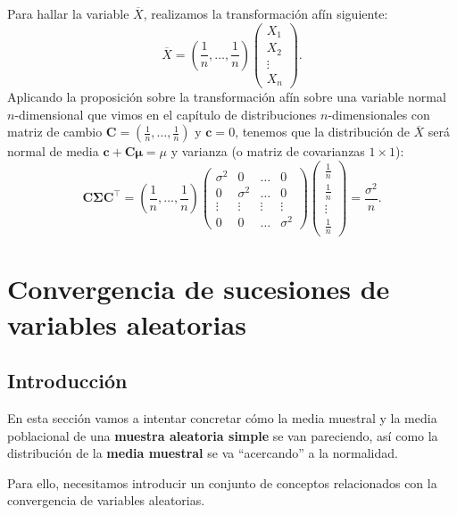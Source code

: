 \documentclass[]{book}
\begin{document}
Para hallar la variable \(\overline{X}\), realizamos la transformación afín siguiente:
\[
\overline{X}=\left(\frac{1}{n},\ldots,\frac{1}{n}\right)\begin{pmatrix} X_1 \\ X_2\\\vdots \\ X_n \end{pmatrix}.
\]
Aplicando la proposición sobre la transformación afín sobre una variable normal \(n\)-dimensional que vimos en el capítulo de distribuciones \(n\)-dimensionales con matriz de cambio \(\mathbf{C}=\left(\frac{1}{n},\ldots,\frac{1}{n}\right)\) y \(\mathbf{c}=0\), tenemos que la distribución de \(\overline{X}\) será normal de media \(\mathbf{c}+\mathbf{C}\mathbf{\mu} = \mu\) y varianza (o matriz de covarianzas \(1\times 1\)):
\[
\mathbf{C}\mathbf{\Sigma}\mathbf{C}^\top =\left(\frac{1}{n},\ldots,\frac{1}{n}\right)\begin{pmatrix}
\sigma^2 & 0 & \ldots & 0 \\
0 & \sigma^2 & \ldots & 0 \\
\vdots & \vdots & \vdots & \vdots \\
0 & 0 & \ldots & \sigma^2
\end{pmatrix} \begin{pmatrix}\frac{1}{n}\\\frac{1}{n}\\\vdots\\\frac{1}{n}\end{pmatrix} =\frac{\sigma^2}{n}.
\]

\hypertarget{convergencia-de-sucesiones-de-variables-aleatorias}{%
\section{Convergencia de sucesiones de variables aleatorias}\label{convergencia-de-sucesiones-de-variables-aleatorias}}

\hypertarget{introducciuxf3n-14}{%
\subsection{Introducción}\label{introducciuxf3n-14}}

En esta sección vamos a intentar concretar cómo la media muestral y la media poblacional de una \textbf{muestra aleatoria simple} se van pareciendo, así como la distribución de la \textbf{media muestral} se va ``acercando'' a la normalidad.

Para ello, necesitamos introducir un conjunto de conceptos relacionados con la convergencia de variables aleatorias.
\end{document}
